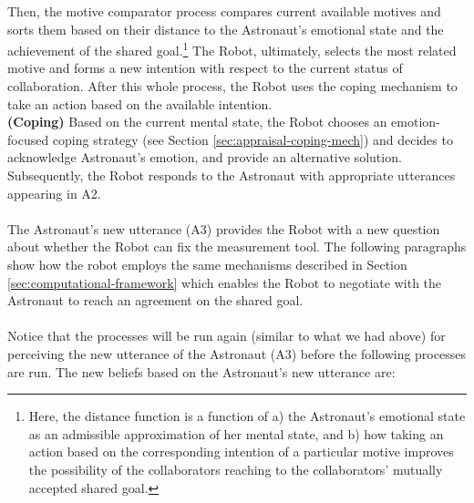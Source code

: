 Then, the motive comparator process compares current available motives and
sorts them based on their distance to the Astronaut's emotional state and
the achievement of the shared goal.\footnote{Here, the distance function is a
function of a) the Astronaut's emotional state as an admissible approximation
of her mental state, and b) how taking an action based on the corresponding
intention of a particular motive improves the possibility of the collaborators
reaching to the collaborators' mutually accepted shared goal.} The Robot,
ultimately, selects the most related motive and forms a new intention with
respect to the current status of collaboration. After this whole process, the
Robot uses the coping mechanism to take an action based on the available
intention.\\

\noindent \textbf{(Coping)} Based on the current mental state, the Robot chooses
an emotion-focused coping strategy (see Section \ref{sec:appraisal-coping-mech})
and decides to acknowledge Astronaut's emotion, and provide an alternative
solution. Subsequently, the Robot responds to the Astronaut with appropriate
utterances appearing in A2.\\

\noindent {}\\

The Astronaut's new utterance (A3) provides the Robot with a new question about
whether the Robot can fix the measurement tool. The following paragraphs show
how the robot employs the same mechanisms described in Section
\ref{sec:computational-framework} which enables the Robot to negotiate with the
Astronaut to reach an agreement on the shared goal.\\

\noindent{}\\

Notice that the processes will be run again (similar to what we had above) for
perceiving the new utterance of the Astronaut (A3) before the following
processes are run. The new beliefs based on the Astronaut's new utterance are:

